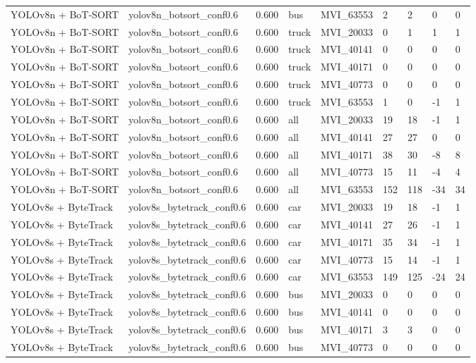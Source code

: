\begin{tabular}{lllllllll}
YOLOv8n + BoT-SORT & yolov8n\_botsort\_conf0.6 & 0.600 & bus & MVI\_63553 & 2 & 2 & 0 & 0 \\
YOLOv8n + BoT-SORT & yolov8n\_botsort\_conf0.6 & 0.600 & truck & MVI\_20033 & 0 & 1 & 1 & 1 \\
YOLOv8n + BoT-SORT & yolov8n\_botsort\_conf0.6 & 0.600 & truck & MVI\_40141 & 0 & 0 & 0 & 0 \\
YOLOv8n + BoT-SORT & yolov8n\_botsort\_conf0.6 & 0.600 & truck & MVI\_40171 & 0 & 0 & 0 & 0 \\
YOLOv8n + BoT-SORT & yolov8n\_botsort\_conf0.6 & 0.600 & truck & MVI\_40773 & 0 & 0 & 0 & 0 \\
YOLOv8n + BoT-SORT & yolov8n\_botsort\_conf0.6 & 0.600 & truck & MVI\_63553 & 1 & 0 & -1 & 1 \\
YOLOv8n + BoT-SORT & yolov8n\_botsort\_conf0.6 & 0.600 & all & MVI\_20033 & 19 & 18 & -1 & 1 \\
YOLOv8n + BoT-SORT & yolov8n\_botsort\_conf0.6 & 0.600 & all & MVI\_40141 & 27 & 27 & 0 & 0 \\
YOLOv8n + BoT-SORT & yolov8n\_botsort\_conf0.6 & 0.600 & all & MVI\_40171 & 38 & 30 & -8 & 8 \\
YOLOv8n + BoT-SORT & yolov8n\_botsort\_conf0.6 & 0.600 & all & MVI\_40773 & 15 & 11 & -4 & 4 \\
YOLOv8n + BoT-SORT & yolov8n\_botsort\_conf0.6 & 0.600 & all & MVI\_63553 & 152 & 118 & -34 & 34 \\
YOLOv8s + ByteTrack & yolov8s\_bytetrack\_conf0.6 & 0.600 & car & MVI\_20033 & 19 & 18 & -1 & 1 \\
YOLOv8s + ByteTrack & yolov8s\_bytetrack\_conf0.6 & 0.600 & car & MVI\_40141 & 27 & 26 & -1 & 1 \\
YOLOv8s + ByteTrack & yolov8s\_bytetrack\_conf0.6 & 0.600 & car & MVI\_40171 & 35 & 34 & -1 & 1 \\
YOLOv8s + ByteTrack & yolov8s\_bytetrack\_conf0.6 & 0.600 & car & MVI\_40773 & 15 & 14 & -1 & 1 \\
YOLOv8s + ByteTrack & yolov8s\_bytetrack\_conf0.6 & 0.600 & car & MVI\_63553 & 149 & 125 & -24 & 24 \\
YOLOv8s + ByteTrack & yolov8s\_bytetrack\_conf0.6 & 0.600 & bus & MVI\_20033 & 0 & 0 & 0 & 0 \\
YOLOv8s + ByteTrack & yolov8s\_bytetrack\_conf0.6 & 0.600 & bus & MVI\_40141 & 0 & 0 & 0 & 0 \\
YOLOv8s + ByteTrack & yolov8s\_bytetrack\_conf0.6 & 0.600 & bus & MVI\_40171 & 3 & 3 & 0 & 0 \\
YOLOv8s + ByteTrack & yolov8s\_bytetrack\_conf0.6 & 0.600 & bus & MVI\_40773 & 0 & 0 & 0 & 0 \\

\end{tabular}
